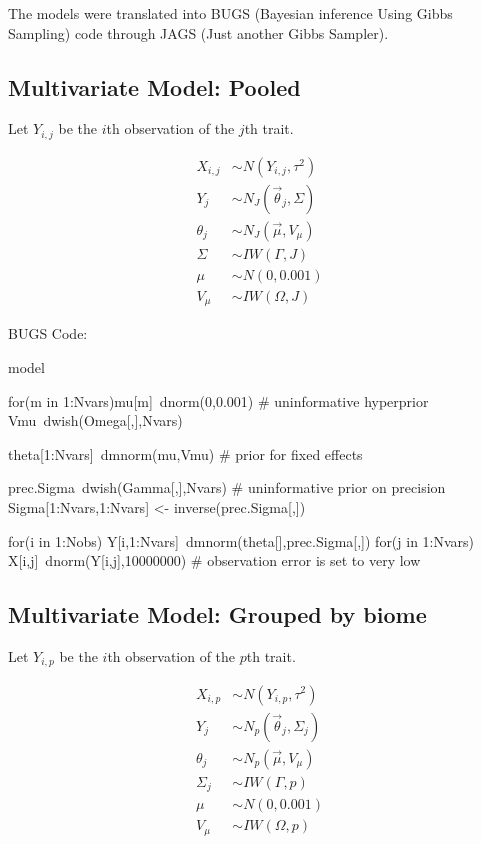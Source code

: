 \documentclass[11pt]{article}
\theoremstyle{definition}
\theoremstyle{remark}
\theoremstyle{definition}
\begin{document}
The models were translated into BUGS (Bayesian inference Using Gibbs Sampling) code through JAGS (Just another Gibbs Sampler). \citep{Gelman2013, Plummer2010, Lebauer2013, koricheva2013handbook} 

\subsection{Multivariate Model: Pooled}

Let $Y_{i,j}$ be the $i$th observation of the $j$th trait.

\begin{align*}
X_{i,j}  &\sim N(Y_{i,j}, \tau^2) \\
Y_j      &\sim N_J(\vec{\theta}_j, \Sigma) \\
\theta_j &\sim N_J(\vec{\mu}, V_\mu) \\
\Sigma   &\sim IW(\Gamma, J) \\	
\mu      &\sim N(0,0.001) \\
V_\mu    &\sim IW(\Omega, J)
\end{align*}

BUGS Code: 

\begin{code}
  model{
    for(m in 1:Nvars){mu[m]~dnorm(0,0.001)}  # uninformative hyperprior
    Vmu~dwish(Omega[,],Nvars) 

    theta[1:Nvars]~dmnorm(mu,Vmu)  # prior for fixed effects
    
    prec.Sigma~dwish(Gamma[,],Nvars) # uninformative prior on precision
    Sigma[1:Nvars,1:Nvars] <- inverse(prec.Sigma[,])
    
    for(i in 1:Nobs){
      Y[i,1:Nvars]~dmnorm(theta[],prec.Sigma[,])
      for(j in 1:Nvars){
        X[i,j]~dnorm(Y[i,j],10000000) # observation error is set to very low
      }
    }
  }
 \end{code}


\subsection{Multivariate Model: Grouped by biome}

Let $Y_{i,p}$ be the $i$th observation of the $p$th trait.

\begin{align*}
X_{i,p}  &\sim N(Y_{i,p}, \tau^2)\\
Y_j      &\sim N_p(\vec{\theta}_j, \Sigma_j) \\
\theta_j &\sim N_p(\vec{\mu}, V_\mu)\\
\Sigma_j &\sim IW(\Gamma, p)\\
\mu      &\sim N(0,0.001) \\
V_\mu    &\sim IW(\Omega, p)
\end{align*}
\end{document}
